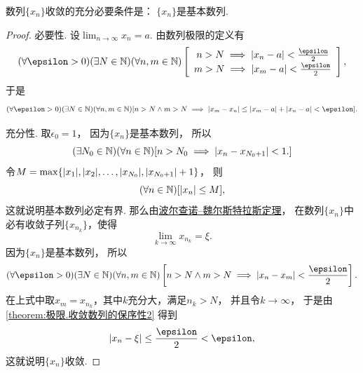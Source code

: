 \begin{theorem}[柯西极限存在准则]\label{theorem:极限.数列的柯西极限存在准则}
数列\(\{x_n\}\)收敛的充分必要条件是：
\(\{x_n\}\)是基本数列.
\begin{proof}
必要性.
设\(\lim_{n\to\infty} x_n = a\).
由数列极限的定义有\begin{equation*}
	(\forall\epsilon>0)
	(\exists N\in\mathbb{N})
	(\forall n,m\in\mathbb{N})
	\left[\def\arraystretch{1.2}
		\begin{array}{c}
			n > N \implies \abs{x_n - a} < \frac\epsilon2 \\
			m > N \implies \abs{x_m - a} < \frac\epsilon2
		\end{array}
	\right],
\end{equation*}
于是\begin{equation*}
	(\forall\epsilon>0)
	(\exists N\in\mathbb{N})
	(\forall n,m\in\mathbb{N})
	[
		n > N \land m > N
		\implies
		\abs{x_m - x_n}
		\leq \abs{x_m - a} + \abs{x_n - a}
		< \epsilon
	].
\end{equation*}

充分性.
取\(\epsilon_0 = 1\)，
因为\(\{x_n\}\)是基本数列，
所以\begin{equation*}
	(\exists N_0\in\mathbb{N})
	(\forall n\in\mathbb{N})
	[
		n > N_0
		\implies
		\abs{x_n - x_{N_0+1}} < 1.
	]
\end{equation*}
令\(M = \max\{\abs{x_1},\abs{x_2},\dotsc,\abs{x_{N_0}},\abs{x_{N_0+1}}+1\}\)，
则\begin{equation*}
	(\forall n\in\mathbb{N})
	[\abs{x_n} \leq M],
\end{equation*}
这就说明基本数列必定有界.
那么由\hyperref[theorem:极限.波尔查诺--魏尔斯特拉斯定理]{波尔查诺--魏尔斯特拉斯定理}，
在数列\(\{x_n\}\)中必有收敛子列\(\{x_{n_k}\}\)，使得\begin{equation*}
	\lim_{k\to\infty} x_{n_k} = \xi.
\end{equation*}
因为\(\{x_n\}\)是基本数列，
所以\begin{equation*}
	(\forall\epsilon>0)
	(\exists N\in\mathbb{N})
	(\forall n,m\in\mathbb{N})
	\left[
		n > N \land m > N
		\implies
		\abs{x_n - x_m} < \frac\epsilon2
	\right].
\end{equation*}
在上式中取\(x_m = x_{n_k}\)，其中\(k\)充分大，满足\(n_k > N\)，
并且令\(k\to\infty\)，
于是由\cref{theorem:极限.收敛数列的保序性2} 得到\begin{equation*}
	\abs{x_n - \xi}
	\leq \frac\epsilon2
	< \epsilon,
\end{equation*}
这就说明\(\{x_n\}\)收敛.
\end{proof}
\end{theorem}

